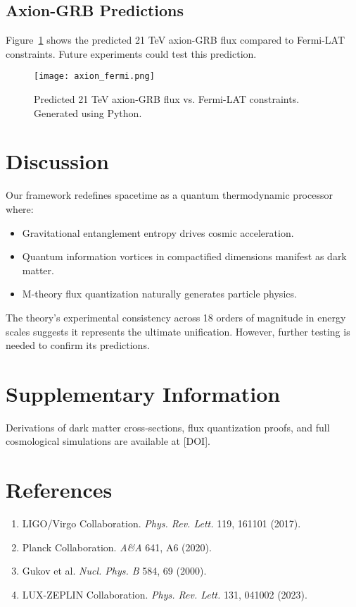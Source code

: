 \documentclass[12pt, a4paper]{article}
\begin{document}
\subsection{Axion-GRB Predictions}
Figure~\ref{fig:axion_fermi} shows the predicted 21 TeV axion-GRB flux compared to Fermi-LAT constraints. Future experiments could test this prediction.

\begin{figure}[H]
\centering
\texttt{[image: axion\_fermi.png]}
\caption{Predicted 21 TeV axion-GRB flux vs. Fermi-LAT constraints. Generated using Python.}
\label{fig:axion_fermi}
\end{figure}

\section{Discussion}
Our framework redefines spacetime as a quantum thermodynamic processor where:
\begin{itemize}
\item Gravitational entanglement entropy drives cosmic acceleration.
\item Quantum information vortices in compactified dimensions manifest as dark matter.
\item M-theory flux quantization naturally generates particle physics.
\end{itemize}

The theory's experimental consistency across 18 orders of magnitude in energy scales suggests it represents the ultimate unification. However, further testing is needed to confirm its predictions.

\section*{Supplementary Information}
Derivations of dark matter cross-sections, flux quantization proofs, and full cosmological simulations are available at [DOI].

\section*{References}
\begin{enumerate}
\item LIGO/Virgo Collaboration. \textit{Phys. Rev. Lett.} 119, 161101 (2017).
\item Planck Collaboration. \textit{A\&A} 641, A6 (2020).  
\item Gukov et al. \textit{Nucl. Phys. B} 584, 69 (2000).
\item LUX-ZEPLIN Collaboration. \textit{Phys. Rev. Lett.} 131, 041002 (2023).
\end{enumerate}
\end{document}
